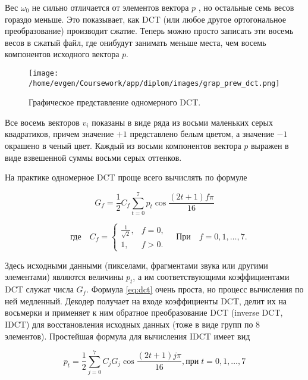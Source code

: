 Вес $\omega_0$ не сильно отличается от элементов вектора $p$ , но остальные семь весов гораздо меньше. 
Это показывает, как DCT (или любое другое ортогональное преобразование) производит сжатие. 
Теперь можно просто записать эти восемь весов в сжатый файл, 
где онибудут занимать меньше места, чем восемь компонентов исходного вектора $p$.

\begin{figure}[h!]
    \centering
    \texttt{[image: /home/evgen/Coursework/app/diplom/images/grap\_prew\_dct.png]}
    \caption{Графическое представление одномерного DCT.}
    \label{fig:gr_dt}
\end{figure}

\clearpage
Все восемь векторов $v_i$ показаны в виде ряда из восьми маленьких серых квадратиков,
причем значение $+1$ представлено белым цветом, а значение $-1$ окрашено в ченый цвет. 
Каждый из восьми компонентов вектора $p$ выражен в виде взвешенной суммы восьми серых оттенков.

На практике одномерное DCT проще всего вычислять по формуле

\begin{equation}
    G_f = \frac{1}{2}C_f \sum_{t=0}^{7} p_t \cos{\frac{(2t+1)f \pi}{16}}
    \label{eq:dct}
\end{equation}

$$
\quad \text{где} \quad C_f = 
\left\{
    \begin{array}{ll}
        \frac{1}{\sqrt{2}}, & f = 0, \\
        1, & f > 0. 
    \end{array}
\right.
\quad \text{При} \quad f = 0, 1, \dots, 7.
$$


Здесь исходными данными (пикселами, фрагментами звука или дру­гими элементами) являются величины $p_t$, 
а им соответствующими коэффициентами DCT служат числа $G_f$. 
Формула \eqref{eq:dct} очень про­ста, но процесс вычисления по ней медленный. 
Декодер получает на входе ко­эффициенты DCT, делит их на восьмерки и применяет к ним обрат­ное преобразование DCT (inverse DCT, IDCT) 
для восстановления исходных данных (тоже в виде групп по 8 элементов). Простейшая формула для вычисления IDCT имеет вид

\begin{equation}
    p_t = \frac{1}{2} \sum_{j=0}^{7} C_j G_j \cos{\frac{(2t+1)j \pi}{16}, \text{при} \; t = 0,1, \dots, 7}
\end{equation}



